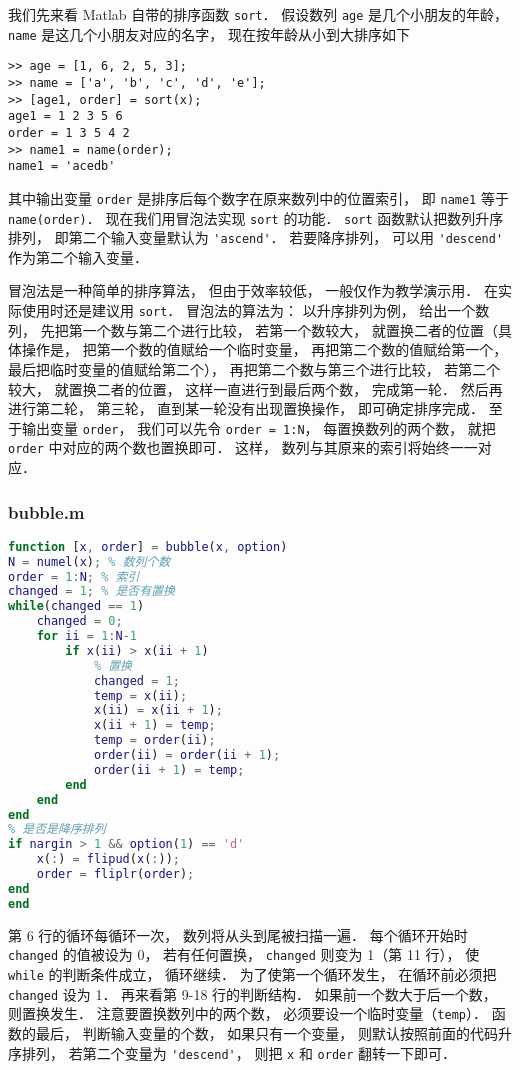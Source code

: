 
我们先来看 Matlab 自带的排序函数 \lstinline|sort|． 假设数列 \lstinline|age| 是几个小朋友的年龄， \lstinline|name| 是这几个小朋友对应的名字， 现在按年龄从小到大排序如下
\begin{lstlisting}[language=matlabC]
>> age = [1, 6, 2, 5, 3];
>> name = ['a', 'b', 'c', 'd', 'e'];
>> [age1, order] = sort(x);
age1 = 1 2 3 5 6
order = 1 3 5 4 2
>> name1 = name(order);
name1 = 'acedb'
\end{lstlisting}
其中输出变量 \lstinline|order| 是排序后每个数字在原来数列中的位置索引， 即 \lstinline|name1| 等于 \lstinline|name(order)|． 现在我们用冒泡法实现 \lstinline|sort| 的功能． \lstinline|sort| 函数默认把数列升序排列， 即第二个输入变量默认为 \lstinline|'ascend'|． 若要降序排列， 可以用 \lstinline|'descend'| 作为第二个输入变量．

冒泡法是一种简单的排序算法， 但由于效率较低， 一般仅作为教学演示用． 在实际使用时还是建议用 \lstinline|sort|． 冒泡法的算法为： 以升序排列为例， 给出一个数列， 先把第一个数与第二个进行比较， 若第一个数较大， 就置换二者的位置（具体操作是， 把第一个数的值赋给一个临时变量， 再把第二个数的值赋给第一个， 最后把临时变量的值赋给第二个）， 再把第二个数与第三个进行比较， 若第二个较大， 就置换二者的位置， 这样一直进行到最后两个数， 完成第一轮． 然后再进行第二轮， 第三轮， 直到某一轮没有出现置换操作， 即可确定排序完成． 至于输出变量 \lstinline|order|， 我们可以先令 \lstinline|order = 1:N|， 每置换数列的两个数， 就把 \lstinline|order| 中对应的两个数也置换即可． 这样， 数列与其原来的索引将始终一一对应． 

\subsubsection{bubble.m}
\begin{lstlisting}[language=matlab]
% 冒泡法排序
function [x, order] = bubble(x, option)
N = numel(x); % 数列个数
order = 1:N; % 索引
changed = 1; % 是否有置换
while(changed == 1)
    changed = 0;
    for ii = 1:N-1
        if x(ii) > x(ii + 1)
            % 置换
            changed = 1;
            temp = x(ii);
            x(ii) = x(ii + 1);
            x(ii + 1) = temp;
            temp = order(ii);
            order(ii) = order(ii + 1);
            order(ii + 1) = temp;
        end
    end
end
% 是否是降序排列
if nargin > 1 && option(1) == 'd'
    x(:) = flipud(x(:));
    order = fliplr(order);
end
end
\end{lstlisting}

第 6 行的循环每循环一次， 数列将从头到尾被扫描一遍． 每个循环开始时 \lstinline|changed| 的值被设为 0， 若有任何置换， \lstinline|changed| 则变为 1（第 11 行）， 使 \lstinline|while| 的判断条件成立， 循环继续． 为了使第一个循环发生， 在循环前必须把 \lstinline|changed| 设为 1． 再来看第 9-18 行的判断结构． 如果前一个数大于后一个数， 则置换发生． 注意要置换数列中的两个数， 必须要设一个临时变量（\lstinline|temp|）． 函数的最后， 判断输入变量的个数， 如果只有一个变量， 则默认按照前面的代码升序排列， 若第二个变量为 \lstinline|'descend'|， 则把 \lstinline|x| 和 \lstinline|order| 翻转一下即可．
